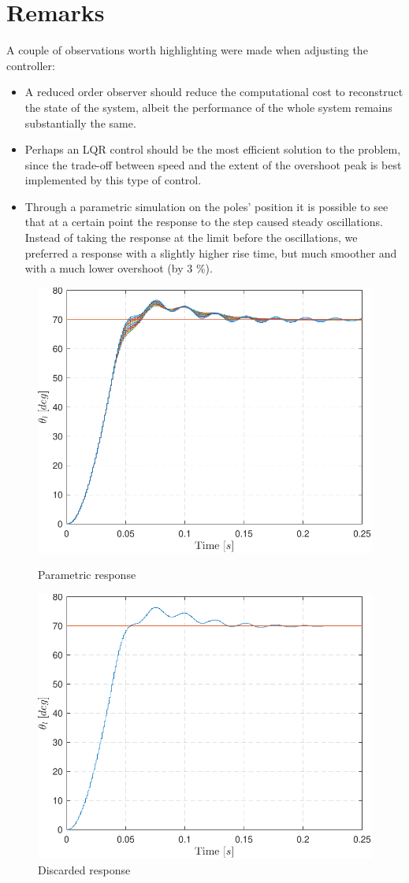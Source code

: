 \documentclass[11pt]{article}
\begin{document}
\section{Remarks}
A couple of observations worth highlighting were made when adjusting the controller:

	\begin{itemize}
		\item A reduced order observer should reduce the computational cost to reconstruct the state of the system, albeit the performance
			of the whole system remains substantially the same.
		\item Perhaps an LQR control should be the most efficient solution to the problem, since the trade-off between speed and
			the extent of the overshoot peak is best implemented by this type of control.
	    \item Through a parametric simulation on the poles' position it is possible to see that at a certain point the response to the step caused steady oscillations. Instead of taking the response at the limit before the oscillations, we preferred a response with a slightly higher rise time, but much smoother and with a much lower overshoot (by 3 \%).
	\end{itemize}
	
\vspace{-10pt}
	
\begin{figure}[!h]
   \begin{minipage}{0.48\textwidth}
     \centering
     \includegraphics[width=.6\linewidth]{images/Lab1ChallengePlotParametrico.pdf}
     \caption{Parametric response}
   \end{minipage}\hfill
   \begin{minipage}{0.48\textwidth}
     \centering
     \includegraphics[width=.6\linewidth]{images/Lab1ChallengePlotScartato.pdf}
     \caption{Discarded response}
   \end{minipage}
\end{figure}
		
\end{document}
